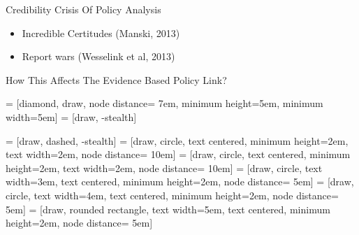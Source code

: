 \documentclass{beamer}
\begin{document}
\begin{frame}{Credibility Crisis Of Policy Analysis}
\begin{itemize}
\item Incredible Certitudes  (Manski, 2013) 
\item Report wars (Wesselink et al, 2013) 
\end{itemize}
\end{frame} 

\begin{frame}[shrink=30]{How This Affects The Evidence Based Policy Link?}
\pause

 = [diamond, draw, node distance= 7em, minimum height=5em, minimum width=5em]
 = [draw, -stealth]

 = [draw, dashed, -stealth]
 = [draw, circle, text centered, minimum height=2em, text width=2em, node distance= 10em]
 = [draw, circle, text centered, minimum height=2em, text width=2em, node distance= 10em]
 = [draw, circle,  text width=3em, text centered, minimum height=2em, node distance= 5em]
 = [draw, circle,  text width=4em, text centered, minimum height=2em, node distance= 5em]
 = [draw, rounded rectangle,  text width=5em, text centered, minimum height=2em, node distance= 5em]

\begin{figure}[h!]
\centering
\hspace*{0.2\linewidth}
\end{figure}
\end{frame}
\end{document}
